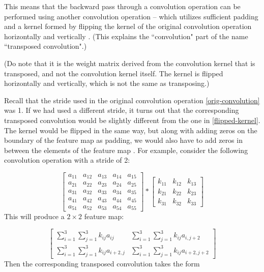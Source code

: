 \documentclass{article}[a4paper]
\begin{document}
This means that the backward pass through a convolution operation can be performed using another convolution operation -- which utilizes sufficient padding and a kernel formed by flipping the kernel of the original convolution operation horizontally and vertically \cite{zeiler2014visualizing, kafunah2016backpropagation}. (This explains the ``convolution" part of the name ``transposed convolution".)

(Do note that it is the weight matrix derived from the convolution kernel that is transposed, and not the convolution kernel itself. The kernel is flipped horizontally and vertically, which is not the same as transposing.)

Recall that the stride used in the original convolution operation \eqref{orig-convolution} was 1. If we had used a different stride, it turns out that the corresponding transposed convolution would be slightly different from the one in \eqref{flipped-kernel}. The kernel would be flipped in the same way, but along with adding zeros on the boundary of the feature map as padding, we would also have to add zeros in between the elements of the feature map \cite{dumoulin2016guide}. For example, consider the following convolution operation with a stride of 2:

\begin{equation}
	\label{strided-convolution}
	\begin{bmatrix}
		a_{11} & a_{12} & a_{13} & a_{14} & a_{15} \\
		a_{21} & a_{22} & a_{23} & a_{24} & a_{25} \\
		a_{31} & a_{32} & a_{33} & a_{34} & a_{35} \\
		a_{41} & a_{42} & a_{43} & a_{44} & a_{45} \\
		a_{51} & a_{52} & a_{53} & a_{54} & a_{55}
	\end{bmatrix} *
	\begin{bmatrix}
		k_{11} & k_{12} & k_{13} \\
		k_{21} & k_{22} & k_{23} \\
		k_{31} & k_{32} & k_{33}
	\end{bmatrix}
\end{equation}
This will produce a $2 \times 2$ feature map:

\begin{equation*}
	\renewcommand{\arraystretch}{1.5}
	\begin{bmatrix}
		\sum_{i=1}^3 \sum_{j=1}^3 k_{ij} a_{ij} & \sum_{i=1}^3 \sum_{j=1}^3 k_{ij} a_{i,j{+}2} \\
		\sum_{i=1}^3 \sum_{j=1}^3 k_{ij} a_{i{+}2,j} & \sum_{i=1}^3 \sum_{j=1}^3 k_{ij} a_{i{+}2,j{+}2}
	\end{bmatrix}
\end{equation*}
Then the corresponding transposed convolution takes the form
\end{document}
